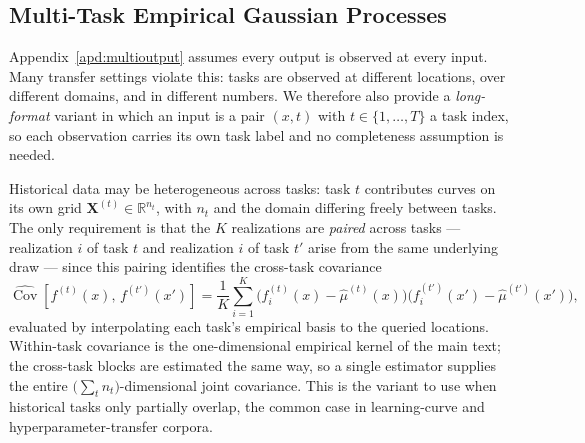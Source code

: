 \documentclass[10pt]{article}
\newcommand{\bX}{\mathbf{X}}
\begin{document}
\subsection{Multi-Task Empirical Gaussian Processes}
\label{apd:multitask}

Appendix~\ref{apd:multioutput} assumes every output is observed at every input. Many
transfer settings violate this: tasks are observed at different locations, over
different domains, and in different numbers. We therefore also provide a
\emph{long-format} variant in which an input is a pair $(x,t)$ with
$t\in\{1,\dots,T\}$ a task index, so each observation carries its own task label and
no completeness assumption is needed.

Historical data may be heterogeneous across tasks: task $t$ contributes curves on its
own grid $\bX^{(t)}\in\mathbb{R}^{n_t}$, with $n_t$ and the domain differing freely
between tasks. The only requirement is that the $K$ realizations are \emph{paired}
across tasks --- realization $i$ of task $t$ and realization $i$ of task $t'$ arise
from the same underlying draw --- since this pairing identifies the cross-task
covariance
\begin{equation}
    \widehat{\operatorname{Cov}}\!\left[f^{(t)}(x),\, f^{(t')}(x')\right]
    = \frac{1}{K}\sum_{i=1}^{K}
      \big(f^{(t)}_i(x) - \hat\mu^{(t)}(x)\big)
      \big(f^{(t')}_i(x') - \hat\mu^{(t')}(x')\big),
\end{equation}
evaluated by interpolating each task's empirical basis to the queried locations.
Within-task covariance is the one-dimensional empirical kernel of the main text; the
cross-task blocks are estimated the same way, so a single estimator supplies the
entire $\big(\sum_t n_t\big)$-dimensional joint covariance. This is the variant to
use when historical tasks only partially overlap, the common case in learning-curve
and hyperparameter-transfer corpora.
\end{document}

